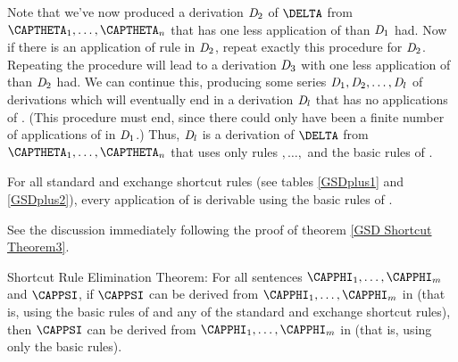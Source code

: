 \begin{PROOF}
Note that we've now produced a derivation $\mathit{D}_2$ of $\DELTA$ from $\CAPTHETA_1,\ldots,\CAPTHETA_{\integer{n}}$ that has one less application of  than $\mathit{D}_1$ had. 
Now if there is an application of rule  in $\mathit{D}_2$, repeat exactly this procedure for $\mathit{D}_2$. 
Repeating the procedure will lead to a derivation $\mathit{D}_3$ with one less application of  than $\mathit{D}_2$ had. 
We can continue this, producing some series $\mathit{D}_1,\mathit{D}_2,\ldots,\mathit{D}_{l}$ of derivations which will eventually end in a derivation $\mathit{D}_{l}$ that has no applications of . 
(This procedure must end, since there could only have been a finite number of applications of  in $\mathit{D}_1$.) 
Thus, $\mathit{D}_{l}$ is a derivation of $\DELTA$ from $\CAPTHETA_1,\ldots,\CAPTHETA_{\integer{n}}$ that uses only rules $,\ldots,$ and the basic rules of \GSD{}.
\end{PROOF}
\begin{THEOREM}{}
For all standard and exchange shortcut rules  (see tables \ref{GSDplus1} and \ref{GSDplus2}), every application of  is derivable using the basic rules of \GSD{}.
\end{THEOREM}
\begin{PROOF}
See the discussion immediately following the proof of theorem \ref{GSD Shortcut Theorem3}.
\end{PROOF}
\begin{THEOREM}{ Shortcut Rule Elimination Theorem:}
For all \GSL{} sentences $\CAPPHI_1,\ldots,\CAPPHI_{\integer{m}}$ and $\CAPPSI$, if $\CAPPSI$ can be derived from $\CAPPHI_1,\ldots,\CAPPHI_{\integer{m}}$ in \GSDP{} (that is, using the basic rules of \GSD{} and any of the standard and exchange shortcut rules), then $\CAPPSI$ can be derived from $\CAPPHI_1,\ldots,\CAPPHI_{\integer{m}}$ in \GSD{} (that is, using only the basic rules).
\end{THEOREM}
